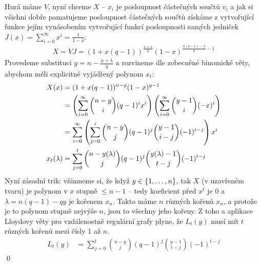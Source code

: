 Hurá máme $V$, nyní chceme $X$ -- $x_i$ je posloupnost částečných součtů
$v_i$ a jak si všichni dobře pamatujeme posloupnost částečných součtů získáme
z vytvořující funkce jejím vynásobením vytvořující funkcí posloupnosti samých jedniček
$J(x) = \sum_{i=0}^\infty x^i = \frac{1}{1-x}$:
\begin{align}
  X = VJ =  (1 + x(q-1))^{\frac{n + \lambda}{q}} (1 - x)^{\frac{n(q-1) - \lambda}{q} - 1}
\end{align}
Provedeme substituci $y = n - \frac{n + \lambda}{q}$
a rozvineme dle zobecněné binomické věty, abychom měli explicitně vyjádřený
polynom $x_t$:
\begin{align}
  X(x) &= (1 + x(q-1))^{n - y} (1 - x)^{y - 1} \\
       &= \br{\sum_{i=0}^\infty {n - y \choose i} (q-1)^i x^i}
          \br{\sum_{i=0}^\infty {y - 1 \choose i} (-x)^i } \\
       &= \sum_{i=0}^\infty \br{\sum_{j=0}^i {n - y \choose j} (q-1)^j
                                {y - 1 \choose i - j} (-1)^{i-j}} x^i \\
%
  x_t(\lambda) &= \sum_{j=0}^t {n - y(\lambda) \choose j} (q-1)^j
                                {y(\lambda) - 1 \choose t - j} (-1)^{t-j}
\end{align}
Nyní zásadní trik: všimneme si, že když $y \in \left\{1, \ldots, n\right\}$, tak
$X$ (v uzavřeném tvaru) je polynom v $x$ stupně $\leq n - 1$ --
tedy koeficient před $x^t$ je 0
a $\lambda = n(q-1) - qy$ je kořenem $x_n$. Takto máme $n$ různých kořenů
$x_n$, a protože je to polynom stupně nejvýše $n$, jsou to všechny jeho kořeny.
Z toho a aplikace Lloydovy věty pro vzdálenostně regulární grafy plyne,
že $L_t(y)$ musí mít $t$ různých kořenů mezi čísly 1 až $n$.
\begin{align}
  L_t(y) &= \sum_{j=0}^t {n - y \choose j} (q-1)^j
                                {y - 1 \choose t - j} (-1)^{t-j}
\end{align}
\qed

